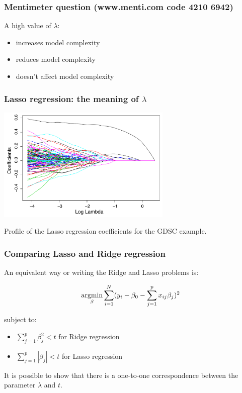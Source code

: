 \documentclass[notes]{beamer}          %
\newcommand{\argmin}{\operatornamewithlimits{argmin}}
\begin{document}
\begin{frame}
\frametitle{Mentimeter question (www.menti.com code 4210 6942)}

A high value of $\lambda$:
\begin{itemize}
    \item increases model complexity
    \item reduces model complexity
    \item doesn't affect model complexity
\end{itemize}
\end{frame}



\begin{frame}
\frametitle{Lasso regression: the meaning of $\lambda$}

\begin{center}
\includegraphics[height=5.5cm]{../figures/week_2_linear_models/Lasso_regression_coefficinets.pdf}
\end{center}

Profile of the Lasso regression coefficients for the GDSC example.

\end{frame}

\begin{frame}
\frametitle{Comparing Lasso and Ridge regression}

An equivalent way or writing the Ridge and Lasso problems is:

\begin{equation*}
    \argmin_{\beta} \sum_{i=1}^N (y_i - \beta_0 -  \sum_{j=1}^p x_{ij}\beta_j)^2
\end{equation*}

subject to: 
\begin{itemize}
    \item $\sum_{j=1}^p \beta_j^2 < t$ for Ridge regression
    \item $\sum_{j=1}^p | \beta_j | < t$ for Lasso regression
\end{itemize}

\vspace{5mm} 

It is possible to show that there is a one-to-one correspondence between the parameter $\lambda$ and $t$.

\end{frame}
\end{document}
